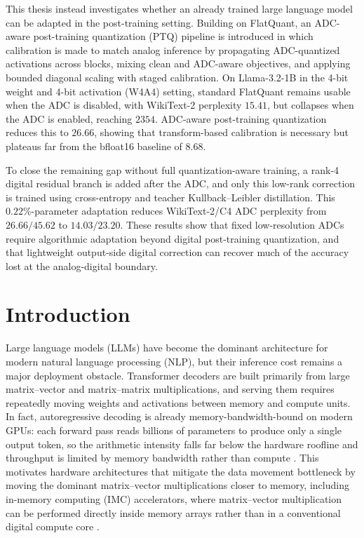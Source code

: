 \documentclass[a4paper,11pt,oneside]{article}
\theoremstyle{breakstyle}
\begin{document}
  This thesis instead investigates whether an already trained large
  language model can be adapted in the post-training setting.
  Building on FlatQuant, an ADC-aware post-training quantization
  (PTQ) pipeline is introduced in which calibration is made to match
  analog inference by propagating ADC-quantized activations across
  blocks, mixing clean and ADC-aware objectives, and applying
  bounded diagonal scaling with staged calibration. On Llama-3.2-1B
  in the 4-bit weight and 4-bit activation (W4A4) setting, standard
  FlatQuant remains usable when the ADC is disabled, with WikiText-2
  perplexity $15.41$, but collapses when the ADC is enabled,
  reaching $2354$. ADC-aware post-training quantization reduces this
  to $26.66$, showing that transform-based calibration is necessary
  but plateaus far from the bfloat16 baseline of $8.68$.

  To close the remaining gap without full quantization-aware
  training, a rank-4 digital residual branch is added after the ADC,
  and only this low-rank correction is trained using cross-entropy
  and teacher Kullback--Leibler distillation. This
  $0.22\%$-parameter adaptation reduces WikiText-2/C4 ADC perplexity
  from $26.66/45.62$ to $\mathbf{14.03}/\mathbf{23.20}$. These
  results show that fixed low-resolution ADCs require algorithmic
  adaptation beyond digital post-training quantization, and that
  lightweight output-side digital correction can recover much of the
  accuracy lost at the analog-digital boundary.

  \newpage
  \tableofcontents

  \clearpage


  \section{Introduction}
\label{sec:introduction}

Large language models (LLMs) have become the dominant architecture for
modern natural language processing (NLP), but their inference cost remains a
major deployment obstacle. Transformer decoders are built primarily from
large matrix--vector and matrix--matrix multiplications, and serving them
requires repeatedly moving weights and activations between memory and
compute units. In fact, autoregressive decoding is already
memory-bandwidth-bound on modern GPUs: each forward pass reads
billions of parameters to produce only a single output token, so the
arithmetic intensity falls far below the hardware roofline and
throughput is limited by memory bandwidth rather than compute
\cite{Pope2023EfficientlyScaling}. This motivates hardware architectures
that mitigate the data movement bottleneck by moving the dominant
matrix--vector multiplications closer to memory, including in-memory
computing (IMC) accelerators, where matrix--vector multiplication
can be performed directly inside memory arrays rather than in a
conventional digital compute core \cite{Xiao2021AnalogAccuracy,LeGallo2023AnalogNAS,
Buechel2025AnalogFoundation}.
\end{document}
